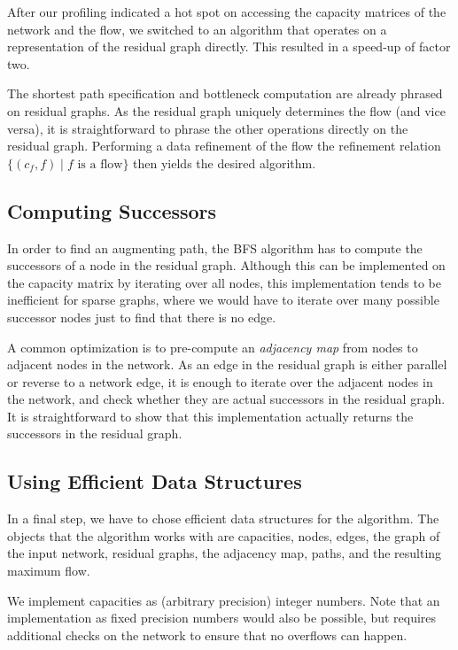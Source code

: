 \documentclass{llncs}
\begin{document}
  After our profiling indicated a hot spot on accessing the capacity matrices of the network and the flow, we switched to 
  an algorithm that operates on a representation of the residual graph directly. This resulted in a speed-up of factor two.
  
  The shortest path specification and bottleneck computation are already phrased on residual graphs. 
  As the residual graph uniquely determines the flow (and vice versa), it is straightforward to phrase the other 
  operations directly on the residual graph. Performing a data refinement of the flow \wrt the refinement 
  relation $\{(c_f,f) \mid \text{$f$ is a flow}\}$ then yields the desired algorithm.
      
  \subsection{Computing Successors}
  In order to find an augmenting path, the BFS algorithm has to compute the successors of a node in the residual graph. 
  Although this can be implemented on the capacity matrix by iterating over all nodes, this implementation tends to be inefficient for sparse graphs,
  where we would have to iterate over many possible successor nodes just to find that there is no edge. 
  
  A common optimization is to pre-compute an \emph{adjacency map} from nodes to adjacent nodes in the network. 
  As an edge in the residual graph is either parallel or reverse to 
  a network edge, it is enough to iterate over the adjacent nodes in the network, and check whether they are actual successors in the residual graph.
  It is straightforward to show that this implementation actually returns the successors in the residual graph.

  \subsection{Using Efficient Data Structures}\label{sec:impl_datastructures}
  In a final step, we have to chose efficient data structures for the algorithm. The objects that the algorithm works with are
  capacities, nodes, edges, the graph of the input network, residual graphs, the adjacency map, paths, and the resulting maximum flow. 
  
  We implement capacities as (arbitrary precision) integer numbers. Note that an implementation as fixed precision numbers would also be possible,
  but requires additional checks on the network to ensure that no overflows can happen. 
  
\end{document}
